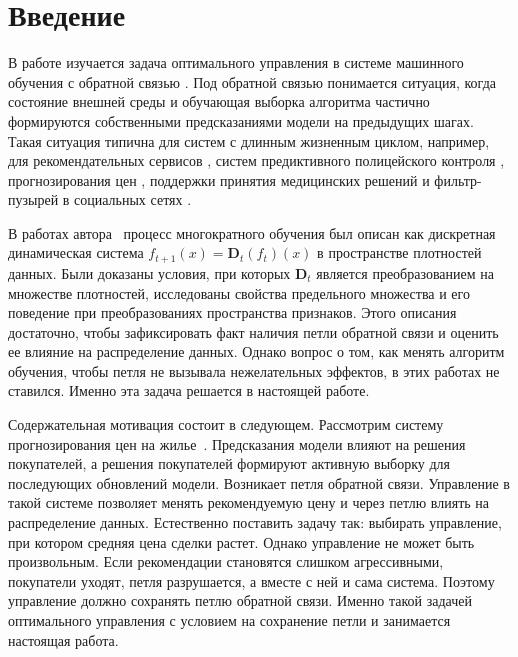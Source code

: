 \documentclass[a4paper,14pt,oneside,openany]{extarticle}
\newcommand{\bD}{\mathbf{D}}
\begin{document}
\newpage
\begingroup
\hypersetup{linkcolor=black}
\tableofcontents
\endgroup

\newpage
\cleardoublepage
{}
{}
\section*{Введение}

В работе изучается задача оптимального управления в системе машинного обучения с обратной связью \cite{khritankov2021existence, khritankov2023positive}. Под обратной связью понимается ситуация, когда состояние внешней среды и обучающая выборка алгоритма частично формируются собственными предсказаниями модели на предыдущих шагах. Такая ситуация типична для систем с длинным жизненным циклом, например, для рекомендательных сервисов \cite{sinha2016deconvolving, jiang2019degenerate}, систем предиктивного полицейского контроля \cite{ensign2018runaway}, прогнозирования цен \cite{khritankov2021hidden}, поддержки принятия медицинских решений \cite{adam2020hidden, adam2022error} и фильтр-пузырей в социальных сетях \cite{davies2018redefining, spohr2017fake, michiels2022filter}.

В работах автора~\cite{veprikov2025mathematical, veprikov2025properties, veprikov2023matematicheskaya} процесс многократного обучения был описан как дискретная динамическая система $f_{t+1}(x) = \bD_t(f_t)(x)$ в пространстве плотностей данных. Были доказаны условия, при которых $\bD_t$ является преобразованием на множестве плотностей, исследованы свойства предельного множества и его поведение при преобразованиях пространства признаков. Этого описания достаточно, чтобы зафиксировать факт наличия петли обратной связи и оценить ее влияние на распределение данных. Однако вопрос о том, как менять алгоритм обучения, чтобы петля не вызывала нежелательных эффектов, в этих работах не ставился. Именно эта задача решается в настоящей работе.

Содержательная мотивация состоит в следующем. Рассмотрим систему прогнозирования цен на жилье~\cite{khritankov2021hidden, khritankov2021existence}. Предсказания модели влияют на решения покупателей, а решения покупателей формируют активную выборку для последующих обновлений модели. Возникает петля обратной связи. Управление в такой системе позволяет менять рекомендуемую цену и через петлю влиять на распределение данных. Естественно поставить задачу так: выбирать управление, при котором средняя цена сделки растет. Однако управление не может быть произвольным. Если рекомендации становятся слишком агрессивными, покупатели уходят, петля разрушается, а вместе с ней и сама система. Поэтому управление должно сохранять петлю обратной связи. Именно такой задачей оптимального управления с условием на сохранение петли и занимается настоящая работа.
\end{document}
